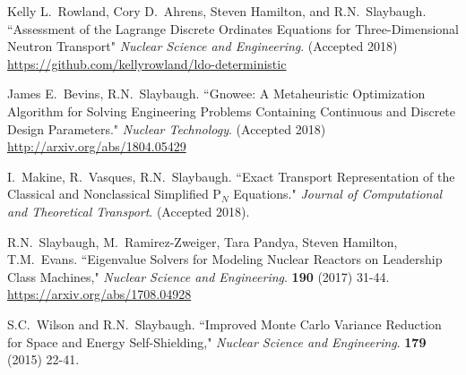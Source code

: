 \begin{bibsection}
\item Kelly L.\ Rowland, Cory D.\ Ahrens, Steven Hamilton, and R.N.\ Slaybaugh. ``Assessment of the Lagrange Discrete Ordinates Equations for Three-Dimensional Neutron Transport"  \textit{Nuclear Science and Engineering}. (Accepted 2018)\\
\url{https://github.com/kellyrowland/ldo-deterministic}

\item James E.\ Bevins, R.N.\ Slaybaugh. ``Gnowee: A Metaheuristic Optimization Algorithm for Solving Engineering Problems Containing Continuous and Discrete Design Parameters." \textit{Nuclear Technology}. (Accepted 2018)\\
\url{http://arxiv.org/abs/1804.05429}

\item I.\ Makine, R.\ Vasques, R.N.\ Slaybaugh. ``Exact Transport Representation of the Classical and Nonclassical Simplified P$_N$ Equations." \textit{Journal of Computational and Theoretical Transport}. (Accepted 2018).

\item R.N.\ Slaybaugh, M.\ Ramirez-Zweiger, Tara Pandya, Steven Hamilton, T.M.\ Evans. ``Eigenvalue Solvers for Modeling Nuclear Reactors on Leadership Class Machines," \textit{Nuclear Science and Engineering}. \textbf{190} (2017) 31-44.\\
\url{https://arxiv.org/abs/1708.04928}

\item S.C.\ Wilson and R.N.\ Slaybaugh. ``Improved Monte Carlo Variance Reduction for Space and Energy Self-Shielding," \textit{Nuclear Science and Engineering}. \textbf{179} (2015) 22-41.
\end{bibsection}

